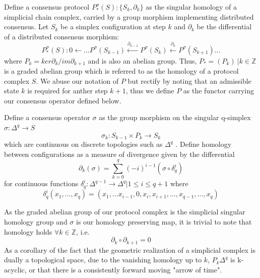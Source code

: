 \documentclass[runningheads]{llncs}
\begin{document}
Define a consensus protocol $P^\sigma_{*}(S):\{S_k, \partial_k\}$ as the singular homology of a simplicial chain complex, carried by a group morphism implementing distributed consensus. Let $S_k$ be a simplex configuration at step $k$ and $\partial_k$ be the differential of a distributed consensus morphism:
\begin{equation}
P^\sigma_{*}(S): 0 \leftarrow \dots P^\sigma(S_{k-1})\xleftarrow {\partial_{k-1}} P^\sigma(S_{k})\xleftarrow {\partial_{k}} P^\sigma(S_{k+1}) \dots
\end{equation}
where $P_k = ker \partial_k / im \partial_{k+1}$ and is also an abelian group. Thus, $P_*= (P_k) \ | k \in \mathbb{Z}$ is a graded abelian group which is referred to as the homology of a protocol complex $S$. We abuse our notation of $P$ but rectify by noting that an admissible state $k$ is required for anther step $k + 1$, thus we define $P$ as the functor carrying our consensus operator defined below.

Define a consensus operator $\sigma$ as the group morphism on the singular q-simplex $\sigma: \Delta^q \rightarrow S$ 
\begin{equation} \label{eq1}
\sigma_k: S_{k-1} \times P_k \rightarrow S_{k}
\end{equation} \label{eq1}
which are continuous on discrete topologies such as $\Delta^q$ \cite{ref_article1}. Define homology between configurations as a measure of divergence given by the differential 
\begin{equation} 
\partial_k(\sigma) = \sum^{q}_{k=0} (-i)^{i-1}(\sigma \circ \delta_q^{i} )
\end{equation}
for continuous functions $\delta^{i}_q: \Delta^{q-1} \rightarrow \Delta^q | 1 \leq i \leq q+1$ where 
\begin{equation}
\delta^{i}_q(x_1, \dots, x_q) = (x_1, \dots x_{i-1}, 0, x_i, x_{i+1}, \dots, x_{q-1}, \dots, x_q)
\end{equation}

As the graded abelian group of our protocol complex is the simplicial singular homology group and $\sigma$ is our homology preserving map, it is trivial to note that homology holds $\forall k \in \mathbb{Z}$, i.e.
\begin{equation} \label{eq1}
\partial_k \circ \partial_{k+1} = 0
\end{equation} \label{eq1}
As a corollary of the fact that the geometric realization of a simplicial complex is dually a topological space, due to the vanishing homology up to $k$, $P_k\Delta^q$ is k-acyclic, or that there is a consistently forward moving "arrow of time".
\end{document}
